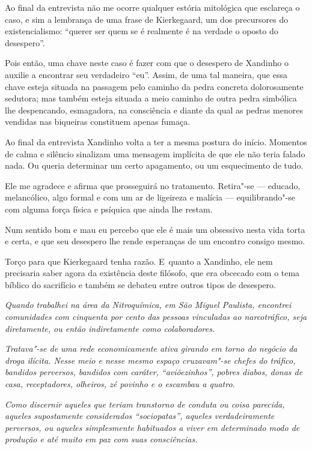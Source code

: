 \asterisc{}

Ao final da entrevista não me ocorre qualquer estória mitológica que
esclareça o caso, e sim a lembrança de uma frase de Kierkegaard, um dos
precursores do existencialismo: ``querer ser quem se é realmente é na
verdade o oposto do desespero''.

Pois então, uma chave neste caso é fazer com que o desespero de Xandinho
o auxilie a encontrar seu verdadeiro ``eu''. Assim, de uma tal maneira,
que essa chave esteja situada na passagem pelo caminho da pedra concreta
dolorosamente sedutora; mas também esteja situada a meio caminho de
outra pedra simbólica lhe despencando, esmagadora, na consciência e
diante da qual as pedras menores vendidas nas biqueiras constituem
apenas fumaça.

Ao final da entrevista Xandinho volta a ter a mesma postura do início.
Momentos de calma e silêncio sinalizam uma mensagem implícita de que ele
não teria falado nada. Ou queria determinar um certo apagamento, ou um
esquecimento de tudo.

Ele me agradece e afirma que prosseguirá no tratamento. Retira"-se ---
educado, melancólico, algo formal e com um ar de ligeireza e malícia ---
equilibrando"-se com alguma força física e psíquica que ainda lhe restam.

Num sentido bom e mau eu percebo que ele é mais um obsessivo nesta vida
torta e certa, e que seu desespero lhe rende esperanças de um encontro
consigo mesmo.

Torço para que Kierkegaard tenha razão. E~quanto a Xandinho, ele nem
precisaria saber agora da existência deste filósofo, que era obcecado
com o tema bíblico do sacrifício e também se debateu entre outros tipos
de desespero.~

\asterisc{}


\emph{Quando trabalhei na área da Nitroquímica, em
São Miguel Paulista, encontrei comunidades com cinquenta por cento das
pessoas vinculadas ao narcotráfico, seja diretamente, ou então
indiretamente como colaboradores.}

\emph{Tratava"-se de uma rede economicamente ativa girando em torno do
negócio da droga ilícita. Nesse meio e nesse mesmo espaço cruzavam"-se
chefes do tráfico, bandidos perversos, bandidos com caráter,
``aviõezinhos'', pobres diabos, donas de casa, receptadores, olheiros,
zé povinho e o escambau a quatro.}

\emph{Como discernir aqueles que teriam transtorno
de conduta ou coisa parecida, aqueles supostamente considerados
``sociopatas'', aqueles verdadeiramente perversos, ou aqueles
simplesmente habituados a viver em determinado modo de produção e até
muito em paz com suas consciências.}


